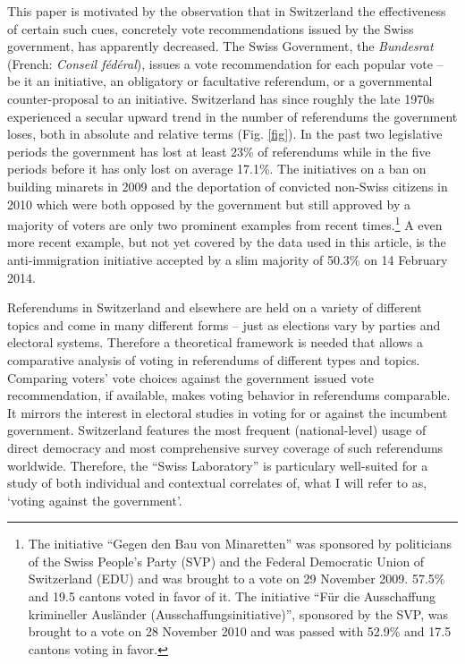 \documentclass[11pt,a4paper]{article}\usepackage[]{graphicx}\usepackage[]{color}
\begin{document}
    This paper is motivated by the observation that in Switzerland the effectiveness of certain such cues, concretely vote recommendations issued by the Swiss government, has apparently decreased. The Swiss Government, the \textit{Bundesrat} (French: \textit{Conseil fédéral}), issues a vote recommendation for each popular vote -- be it an initiative, an obligatory or facultative referendum, or a governmental counter-proposal to an initiative. Switzerland has since roughly the late 1970s experienced a secular upward trend in the number of referendums the government loses, both in absolute and relative terms (Fig. \ref{fig}). In the past two legislative periods the government has lost at least 23\% of referendums while in the five periods before it has only lost on average 17.1\%. 
    The initiatives on a ban on building minarets in 2009 and the deportation of convicted non-Swiss citizens in 2010 which were both opposed by the government but still approved by a majority of voters are only two prominent examples from recent times.\footnote{The initiative ``Gegen den Bau von Minaretten'' was sponsored by politicians of the Swiss People's Party (SVP) and the Federal Democratic Union of Switzerland (EDU) and was brought to a vote on 29 November 2009. 57.5\% and
    19.5 cantons voted in favor of it. 
    The initiative ``Für die Ausschaffung krimineller Ausländer (Ausschaffungsinitiative)'', sponsored by the SVP, was brought to a vote on 28 November 2010 and was passed with 52.9\% and  
    17.5 cantons voting in favor. } A even more recent example, but not yet covered by the data used in this article, is the anti-immigration initiative accepted by a slim majority of 50.3\% on 14 February 2014.
    
    Referendums in Switzerland and elsewhere are held on a variety of different topics and come in many different forms -- just as elections vary by parties and electoral systems. Therefore a theoretical framework is needed that allows a comparative analysis of voting in referendums of different types and topics. Comparing voters' vote choices against the government issued vote recommendation, if available, makes voting behavior in referendums comparable. It mirrors the interest in electoral studies in voting for or against the incumbent government.  Switzerland features the most frequent (national-level) usage of direct democracy and most comprehensive survey coverage of such referendums worldwide. Therefore, the ``Swiss Laboratory'' \citep{kriesi_direct_2005} is particulary well-suited for a study of both individual and contextual correlates of, what I will refer to as, `voting against the government'.
    
\end{document}
